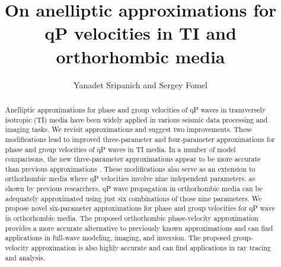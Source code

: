 \title{On anelliptic approximations for qP velocities in TI and orthorhombic media}
\author{Yanadet Sripanich and Sergey Fomel}

\address{
Bureau of Economic Geology \\
John A. and Katherine G. Jackson School of Geosciences \\
The University of Texas at Austin \\
University Station, Box X \\
Austin, TX 78713-8924 
}
\maketitle


\begin{abstract}
Anelliptic approximations for phase and group velocities of qP waves in transversely isotropic (TI) media have been widely applied in various seismic data processing and imaging tasks. 
We revisit   approximations and suggest two improvements. 
 These modifications lead to improved three-parameter and four-parameter approximations for phase and group velocities of qP waves in TI media. In a number of model comparisons, the new three-parameter approximations appear to be more accurate than  previous approximations .
These modifications also serve as   an extension to orthorhombic media where qP velocities involve nine independent  parameters.  as shown by previous researchers, qP wave propagation in orthorhombic media can be adequately approximated using just six combinations of those nine parameters. 
We propose novel six-parameter approximations for phase and group velocities for qP wave in orthorhombic media.
The proposed orthorhombic phase-velocity approximation provides a more accurate alternative to previously known approximations and can find applications in full-wave modeling, imaging, and inversion. 
The proposed group-velocity approximation is also highly accurate and can find applications in ray tracing and  analysis.
\end{abstract}

